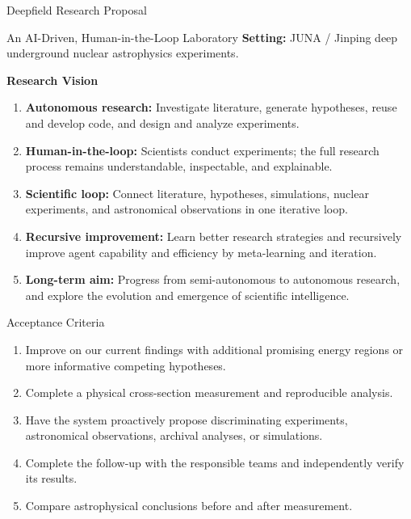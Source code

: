 \setsource{}
\begin{frame}[c,label=md-39]{Deepfield Research Proposal}
\small
\begin{block}{An AI-Driven, Human-in-the-Loop Laboratory}
\textbf{Setting:} JUNA / Jinping deep underground nuclear astrophysics experiments.
\end{block}
\smallskip
\textbf{Research Vision}
\begin{enumerate}
    \renewcommand{\theenumi}{\arabic{enumi}}
    \setlength{\itemsep}{0.3em}
    \item \textbf{Autonomous research:} Investigate literature, generate
    hypotheses, reuse and develop code, and design and analyze experiments.
    \item \textbf{Human-in-the-loop:} Scientists conduct experiments;
    the full research process remains understandable, inspectable, and explainable.
    \item \textbf{Scientific loop:} Connect literature, hypotheses, simulations,
    nuclear experiments, and astronomical observations in one iterative loop.
    \item \textbf{Recursive improvement:} Learn better research
    strategies and recursively improve agent capability and efficiency by meta-learning and iteration.
    \item \textbf{Long-term aim:} Progress from semi-autonomous to autonomous
    research, and explore the evolution and emergence of scientific intelligence.
\end{enumerate}
\end{frame}

\setsource{}
\begin{frame}[t,label=md-41]{Acceptance Criteria}
\small
{}
\smallskip
\begin{enumerate}
\setlength{\itemsep}{0.55em}
    \item Improve on our current findings with additional promising energy
    regions or more informative competing hypotheses.
    \item Complete a physical cross-section measurement and reproducible analysis.
    \item Have the system proactively propose discriminating experiments,
    astronomical observations, archival analyses, or simulations.
    \item Complete the follow-up with the responsible teams and
    independently verify its results.
    \item Compare astrophysical conclusions before and after measurement.
\end{enumerate}

\end{frame}

